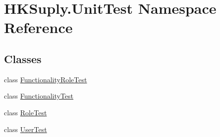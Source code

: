\hypertarget{namespace_h_k_suply_1_1_unit_test}{}\section{H\+K\+Suply.\+Unit\+Test Namespace Reference}
\label{namespace_h_k_suply_1_1_unit_test}
\subsection*{Classes}
\begin{DoxyCompactItemize}
\item 
class \hyperlink{class_h_k_suply_1_1_unit_test_1_1_functionality_role_test}{Functionality\+Role\+Test}
\item 
class \hyperlink{class_h_k_suply_1_1_unit_test_1_1_functionality_test}{Functionality\+Test}
\item 
class \hyperlink{class_h_k_suply_1_1_unit_test_1_1_role_test}{Role\+Test}
\item 
class \hyperlink{class_h_k_suply_1_1_unit_test_1_1_user_test}{User\+Test}
\end{DoxyCompactItemize}
